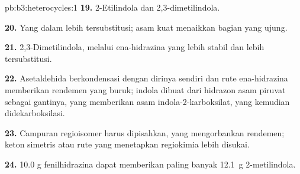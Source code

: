 \begin{solution}{pb:b3:heterocycles:1}
\textbf{19.} 2-Etilindola dan 2,3-dimetilindola.

\textbf{20.} Yang dalam lebih tersubstitusi; asam kuat menaikkan bagian
yang ujung.

\textbf{21.} 2,3-Dimetilindola, melalui ena-hidrazina yang lebih stabil dan lebih
tersubstitusi.

\textbf{22.} Asetaldehida berkondensasi dengan dirinya sendiri dan rute ena-hidrazina memberikan rendemen
yang buruk; indola dibuat dari hidrazon asam piruvat sebagai gantinya, yang memberikan
asam indola-2-karboksilat, yang kemudian didekarboksilasi.

\textbf{23.} Campuran regioisomer harus dipisahkan, yang mengorbankan rendemen; keton
simetris atau rute yang menetapkan regiokimia lebih disukai.

\textbf{24.} 10.0 g fenilhidrazina dapat memberikan paling banyak \qty{12.1}{g} 2-metilindola.
\end{solution}
